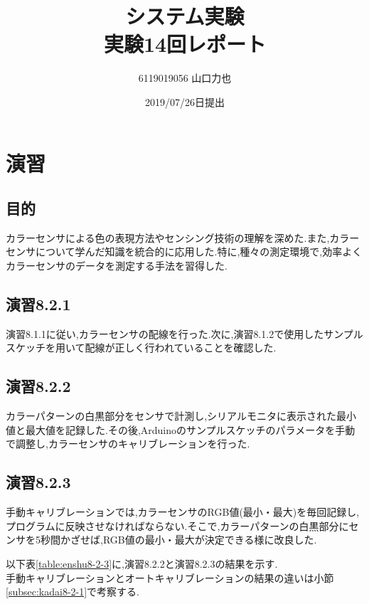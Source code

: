 \documentclass{jarticle}
\title{{システム実験}\\実験14回レポート}
\author{6119019056 山口力也}
\date{2019/07/26日提出}
\begin{document}
\maketitle
\section{演習}

\subsection{目的}
カラーセンサによる色の表現方法やセンシング技術の理解を深めた.また,カラーセンサについて学んだ知識を統合的に応用した.特に,種々の測定環境で,効率よくカラーセンサのデータを測定する手法を習得した.

\subsection{演習8.2.1}
演習8.1.1に従い,カラーセンサの配線を行った.次に,演習8.1.2で使用したサンプルスケッチを用いて配線が正しく行われていることを確認した.

\subsection{演習8.2.2}
カラーパターンの白黒部分をセンサで計測し,シリアルモニタに表示された最小値と最大値を記録した.その後,Arduinoのサンプルスケッチのパラメータを手動で調整し,カラーセンサのキャリブレーションを行った. \\

\subsection{演習8.2.3}
手動キャリブレーションでは,カラーセンサのRGB値(最小・最大)を毎回記録し,プログラムに反映させなければならない.そこで,カラーパターンの白黒部分にセンサを5秒間かざせば,RGB値の最小・最大が決定できる様に改良した.

以下表\ref{table:enshu8-2-3}に,演習8.2.2と演習8.2.3の結果を示す. \\
手動キャリブレーションとオートキャリブレーションの結果の違いは小節\ref{subsec:kadai8-2-1}で考察する.
\end{document}
